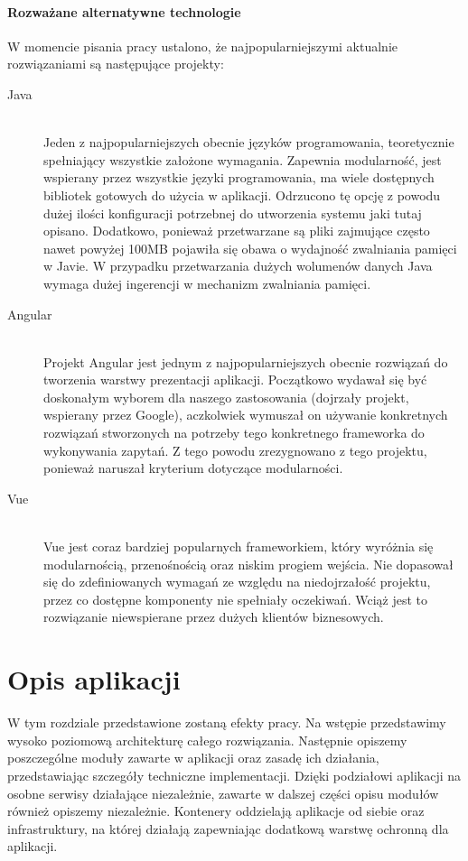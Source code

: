 \documentclass[a4paper,11pt,twoside]{report}
\theoremstyle{definition}
\begin{document}
\subsubsection{Rozważane alternatywne technologie}
W momencie pisania pracy ustalono, że najpopularniejszymi aktualnie rozwiązaniami są następujące projekty:
	  
\begin{description}
	\item [Java] \hfill \\
	Jeden z najpopularniejszych obecnie języków programowania, teoretycznie spełniający wszystkie założone wymagania. Zapewnia modularność, jest wspierany przez wszystkie języki programowania, ma wiele dostępnych bibliotek gotowych do użycia w aplikacji. Odrzucono tę opcję z powodu dużej ilości konfiguracji potrzebnej do utworzenia systemu jaki tutaj opisano. Dodatkowo, ponieważ przetwarzane są pliki zajmujące często nawet powyżej 100MB pojawiła się obawa o wydajność zwalniania pamięci w Javie. W przypadku przetwarzania dużych wolumenów danych Java wymaga dużej ingerencji w mechanizm zwalniania pamięci.
\item[Angular] \hfill \\
  	Projekt Angular jest jednym z najpopularniejszych obecnie rozwiązań do tworzenia warstwy prezentacji aplikacji. Początkowo wydawał się być doskonałym wyborem dla naszego zastosowania (dojrzały projekt, wspierany przez Google), aczkolwiek wymuszał on używanie konkretnych rozwiązań stworzonych na potrzeby tego konkretnego frameworka do wykonywania zapytań. Z tego powodu zrezygnowano z tego projektu, ponieważ naruszał  kryterium dotyczące modularności.
\item[Vue] \hfill \\
	Vue jest coraz bardziej popularnych frameworkiem, który wyróżnia się modularnością, przenośnością oraz niskim progiem wejścia. Nie dopasował się do zdefiniowanych wymagań ze względu na niedojrzałość projektu, przez co dostępne komponenty nie spełniały oczekiwań. Wciąż jest to rozwiązanie niewspierane przez dużych klientów biznesowych.
\end{description}

\chapter{Opis aplikacji}
W tym rozdziale przedstawione zostaną efekty pracy. Na wstępie przedstawimy wysoko poziomową architekturę całego rozwiązania. Następnie opiszemy poszczególne moduły zawarte w aplikacji oraz zasadę ich działania, przedstawiając szczegóły techniczne implementacji. Dzięki podziałowi aplikacji na osobne serwisy działające niezależnie, zawarte w dalszej części opisu modułów również opiszemy niezależnie. Kontenery oddzielają aplikacje od siebie oraz infrastruktury, na której działają zapewniając dodatkową warstwę ochronną dla aplikacji.
\end{document}
